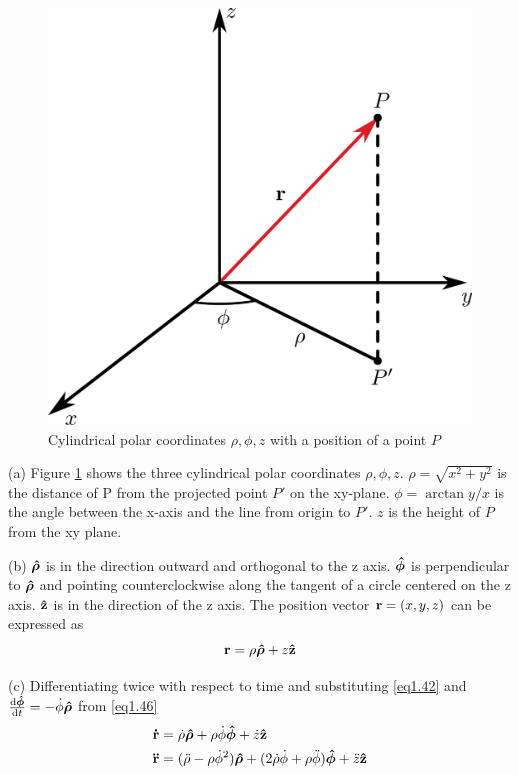 \documentclass[../problems.tex]{subfiles}
\begin{document}
\begin{figure} [ht]
    \centering 
    \includegraphics[scale=1]{fig1_47.png}
    \caption{Cylindrical polar coordinates $\rho, \phi, z$ with a position of a point $P$}
    \label{fig1.7}
\end{figure}

(a) Figure \ref{fig1.7} shows the three cylindrical polar coordinates $\rho, \phi, z$. $\rho 
= \sqrt{x^2 + y^2}$ is the distance of P from the projected point $P'$ on the xy-plane. 
$\phi=\arctan{y/x}$ is the angle between the x-axis and the line from origin to $P'$. $z$ is the 
height of $P$ from the xy plane. 

(b) $\vb*{\hat \rho}$ is in the direction outward and orthogonal to the z axis. $\vb*{\hat \phi}$ is 
perpendicular to $\vb*{\hat \rho}$ and pointing counterclockwise along the tangent of a circle 
centered on the z axis. $\vb{\hat z}$ is in the direction of the z axis. The position vector 
$\vb{r} = (x,y,z)$ can be expressed as
\begin{equation*}
    \vb{r} = \rho \vb*{\hat \rho} + z \vb{\hat z}
\end{equation*}

(c) Differentiating twice with respect to time and substituting \eqref{eq1.42} and 
$\dv{\vb*{\hat \phi}}{t} = -\dot{\phi} \vb*{\hat \rho}$ from \eqref{eq1.46}
\begin{align*}
    \vb{\dot r} &= \dot \rho \vb*{\hat \rho} + \rho \dot \phi \vb*{\hat \phi} + \dot z \vb{\hat z} \\
    \vb{\ddot r} &= (\ddot \rho - \rho \dot \phi^2) \vb*{\hat \rho} + (2\dot \rho \dot \phi + \rho 
    \ddot \phi) \vb*{\hat \phi} + \ddot z \vb{\hat z}
\end{align*}
\end{document}
